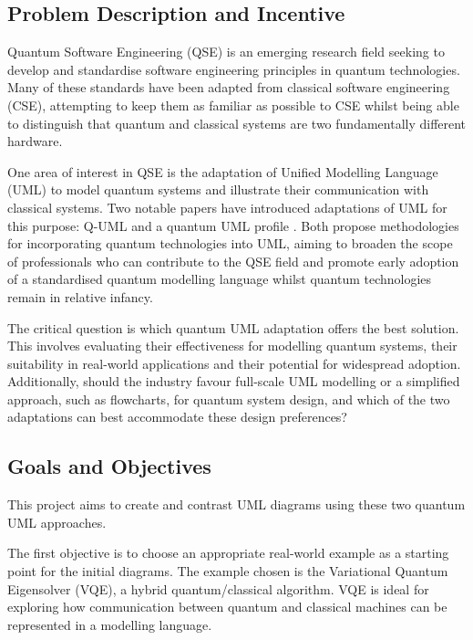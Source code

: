 \documentclass{article}
\begin{document}
\subsection{Problem Description and Incentive}

Quantum Software Engineering (QSE) is an emerging research field seeking to develop and standardise software engineering principles in quantum technologies. Many of these standards have been adapted from classical software engineering (CSE), attempting to keep them as familiar as possible to CSE whilst being able to distinguish that quantum and classical systems are two fundamentally different hardware. 

One area of interest in QSE is the adaptation of Unified Modelling Language (UML) to model quantum systems and illustrate their communication with classical systems. Two notable papers have introduced adaptations of UML for this purpose: Q-UML \cite{Pérez-Delgado2022} and a quantum UML profile \cite{Pérez-Castillo2022}. Both propose methodologies for incorporating quantum technologies into UML, aiming to broaden the scope of professionals who can contribute to the QSE field and promote early adoption of a standardised quantum modelling language whilst quantum technologies remain in relative infancy. 

The critical question is which quantum UML adaptation offers the best solution. This involves evaluating their effectiveness for modelling quantum systems, their suitability in real-world applications and their potential for widespread adoption. Additionally, should the industry favour full-scale UML modelling or a simplified approach, such as flowcharts, for quantum system design, and which of the two adaptations can best accommodate these design preferences?

\subsection{Goals and Objectives}

This project aims to create and contrast UML diagrams using these two quantum UML approaches.

The first objective is to choose an appropriate real-world example as a starting point for the initial diagrams. The example chosen is the Variational Quantum Eigensolver (VQE), a hybrid quantum/classical algorithm. VQE is ideal for exploring how communication between quantum and classical machines can be represented in a modelling language.
\end{document}

